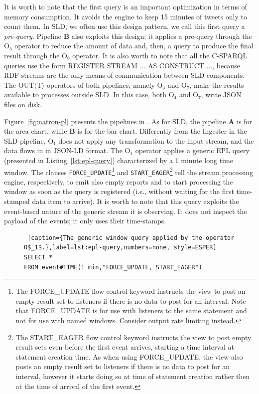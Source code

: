 {It is worth to note that the first query is an important optimization in terms of memory consumption. It avoids the engine to keep 15 minutes of tweets only to count them. In SLD, we often use this design pattern, we call this first query a \textit{pre-query}.
Pipeline \textbf{B} also exploits this design; it applies a pre-query through the O$_5$ operator to reduce the amount of data and, then, a query to produce the final result through the O$_6$ operator. 
It is also worth to note that all the C-SPARQL queries use the form REGISTER STREAM ... AS CONSTRUCT ..., because RDF streams are the only means of communication between SLD components.
The OUT$\langle\mathrm{T}\rangle$ operators of both pipelines, namely O$_4$ and O$_7$, make the results available to processes outside SLD. In this case, both O$_4$ and O$_7$, write JSON files on disk.

Figure~\ref{fig:natron-pl} presents the pipelines in \sti{}. As for SLD, the pipeline \textbf{A} is for the area chart, while \textbf{B} is for the bar chart. 
Differently from the \textsf{Ingester} in the SLD pipeline, O$_1$ does not apply any transformation to the input stream, and the data flows in \sti{} in JSON-LD format.
The O$_1$ operator applies a generic EPL query (presented in Listing~\ref{lst:epl-query}) characterized by a 1 minute long time window.
The clauses \texttt{FORCE\_UPDATE}\footnote{The FORCE\_UPDATE flow control keyword instructs the view to post an empty result set to listeners if there is no data to post for an interval. Note that FORCE\_UPDATE is for use with listeners to the same statement and not for use with named windows. Consider output rate limiting instead.} and \texttt{START\_EAGER}\footnote{The START\_EAGER flow control keyword instructs the view to post empty result sets even before the first event arrives, starting a time interval at statement creation time. As when using FORCE\_UPDATE, the view also posts an empty result set to listeners if there is no data to post for an interval, however it starts doing so at time of statement creation rather then at the time of arrival of the first event.} tell the stream processing engine, respectively, to emit also empty reports and to start processing the window as soon as the query is registered (i.e., without waiting for the first time-stamped data item to arrive).
It is worth to note that this query exploits the event-based nature of the generic stream it is observing.
It does not inspect the payload of the events; it only uses their time-stamps.

\begin{figure}[ht]
\begin{minipage}{0.95\linewidth}
\begin{lstlisting} [caption={The generic window query applied by the operator O$_1$.},label=lst:epl-query,numbers=none, style=ESPER]
SELECT * 
FROM event#TIME(1 min,"FORCE_UPDATE, START_EAGER")
\end{lstlisting}
\end{minipage}
\end{figure}

}
